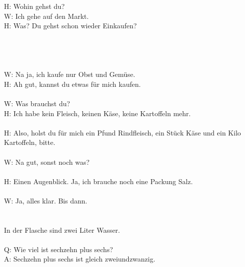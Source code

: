 H: Wohin gehst du? \\
W: Ich gehe auf den Markt. \\
H: Was? Du gehst schon wieder Einkaufen?  \\
\\
\\
\\
\\
W: Na ja, ich kaufe nur Obst und Gemüse.  \\
H: Ah gut, kannst du etwas für mich kaufen. 
\\
\\
W: Was brauchst du? \\
H: Ich habe kein Fleisch, keinen Käse, keine Kartoffeln mehr.  \\
\\
H: Also, holst du für mich ein Pfund Rindfleisch, ein Stück Käse und ein Kilo Kartoffeln, bitte.  \\
\\
W: Na gut, sonst noch was?  \\
\\
H: Einen Augenblick. Ja, ich brauche noch eine Packung Salz.  \\
\\
W: Ja, alles klar. Bis dann.  \\
\\
\\
In der Flasche sind zwei Liter Wasser. \\
\\
Q: Wie viel ist sechzehn plus sechs? \\
A: Sechzehn plus sechs ist gleich zweiundzwanzig. \\

